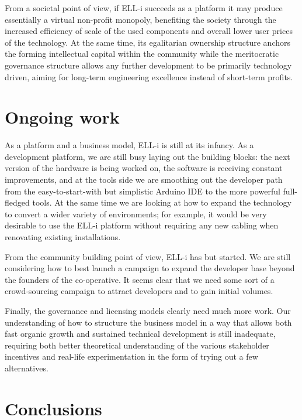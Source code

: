 \documentclass{siamltex}
\begin{document}
From a societal point of view, if ELL-i succeeds as a platform it may
produce essentially a virtual non-profit monopoly, benefiting the
society through the increased efficiency of scale of the used
components and overall lower user prices of the technology.  At the
same time, its egalitarian ownership structure anchors the forming
intellectual capital within the community while the meritocratic
governance structure allows any further development to be primarily
technology driven, aiming for long-term engineering excellence instead
of short-term profits.


\section{Ongoing work}
\label{sec:ongoing}

As a platform and a business model, ELL-i is still at its infancy.  As
a development platform, we are still busy laying out the building
blocks: the next version of the hardware is being worked on, the
software is receiving constant improvements, and at the tools side we
are smoothing out the developer path from the easy-to-start-with but
simplistic Arduino IDE to the more powerful full-fledged tools.  At
the same time we are looking at how to expand the technology to convert
a wider variety of environments; for example, it would be very
desirable to use the ELL-i platform without requiring any new cabling
when renovating existing installations.

From the community building point of view, ELL-i has but started.
We are still considering how to best launch a campaign to expand the
developer base beyond the founders of the co-operative.  It seems
clear that we need some sort of a crowd-sourcing campaign to attract
developers and to gain initial volumes.

Finally, the governance and licensing models clearly need much more
work.  Our understanding of how to structure the business model in a
way that allows both fast organic growth and sustained technical
development is still inadequate, requiring both better theoretical
understanding of the various stakeholder incentives and real-life
experimentation in the form of trying out a few alternatives.


\section{Conclusions}
\label{sec:conclusions}
\end{document}
